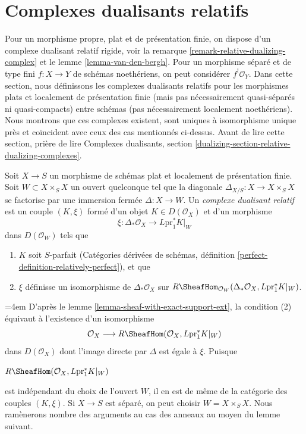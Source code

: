 \section{Complexes dualisants relatifs}
\label{section-relative-dualizing-complexes}

\noindent
Pour un morphisme propre, plat et de présentation finie, on dispose d'un complexe dualisant relatif rigide, voir la remarque \ref{remark-relative-dualizing-complex} et le lemme \ref{lemma-van-den-bergh}. Pour un morphisme séparé et de type fini $f : X \to Y$ de schémas noethériens, on peut considérer $f^!\mathcal{O}_Y$. Dans cette section, nous définissons les complexes dualisants relatifs pour les morphismes plats et localement de présentation finie (mais pas nécessairement quasi-séparés ni quasi-compacts) entre schémas (pas nécessairement localement noethériens). Nous montrons que ces complexes existent, sont uniques à isomorphisme unique près et coïncident avec ceux des cas mentionnés ci-dessus. Avant de lire cette section, prière de lire Complexes dualisants, section \ref{dualizing-section-relative-dualizing-complexes}.

\begin{definition}
\label{definition-relative-dualizing-complex}
Soit $X \to S$ un morphisme de schémas plat et localement de présentation finie. Soit $W \subset X \times_S X$ un ouvert quelconque tel que la diagonale $\Delta_{X/S} : X \to X \times_S X$ se factorise par une immersion fermée $\Delta : X \to W$. Un {\it complexe dualisant relatif} est un couple $(K, \xi)$ formé d'un objet $K \in D(\mathcal{O}_X)$ et d'un morphisme
$$
\xi : \Delta_*\mathcal{O}_X \longrightarrow L\text{pr}_1^*K|_W
$$
dans $D(\mathcal{O}_W)$ tels que
\begin{enumerate}
\item $K$ soit $S$-parfait (Catégories dérivées de schémas, définition \ref{perfect-definition-relatively-perfect}), et que
\item $\xi$ définisse un isomorphisme de $\Delta_*\mathcal{O}_X$ sur
$R\SheafHom_{\mathcal{O}_W}(
\Delta_*\mathcal{O}_X, L\text{pr}_1^*K|_W)$.
\end{enumerate}
\end{definition}

\noindent
\begingroup\emergencystretch=4em
D'après le lemme \ref{lemma-sheaf-with-exact-support-ext}, la condition (2) équivaut à l'existence d'un isomorphisme
$$
\mathcal{O}_X \longrightarrow
R\SheafHom(\mathcal{O}_X, L\text{pr}_1^*K|_W)
$$
dans $D(\mathcal{O}_X)$ dont l'image directe par $\Delta$ est égale à $\xi$. Puisque
\par\noindent\hfil
$R\SheafHom(\mathcal{O}_X, L\text{pr}_1^*K|_W)$
\hfil\par\noindent
est indépendant du choix de l'ouvert $W$, il en est de même de la catégorie des couples $(K, \xi)$. Si $X \to S$ est séparé, on peut choisir $W = X \times_S X$. Nous ramènerons nombre des arguments au cas des anneaux au moyen du lemme suivant.\par\endgroup

